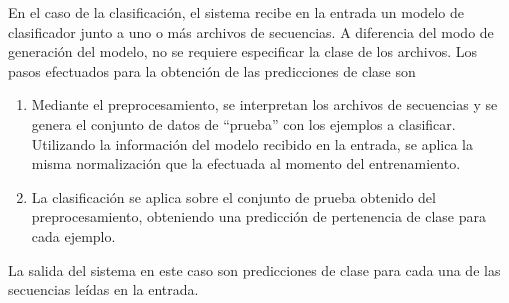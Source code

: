 En el caso de la clasificación, el sistema recibe en la entrada un
modelo de clasificador junto a uno o más archivos de secuencias.
A diferencia del modo de generación del modelo, no se
requiere especificar la clase de los archivos. %
Los pasos efectuados para la obtención de las predicciones de clase
son
%
\begin{enumerate}
\item
  Mediante el preprocesamiento, se interpretan los archivos de
  secuencias y se genera el conjunto de datos de ``prueba'' con los
  ejemplos a clasificar. Utilizando la información del modelo recibido
  en la entrada, se aplica la misma normalización que la efectuada al
  momento del entrenamiento.
\item
  La clasificación se aplica sobre el conjunto de prueba obtenido
  del preprocesamiento, obteniendo una predicción de pertenencia de
  clase para cada ejemplo.
\end{enumerate}
%
La salida del sistema en este caso son predicciones de clase para cada
una de las secuencias leídas en la entrada.
